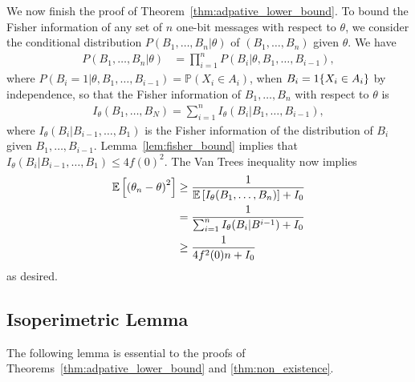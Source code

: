 We now finish the proof of Theorem~\ref{thm:adpative_lower_bound}.
To bound the Fisher information of any set of $n$ one-bit
messages with respect to $\theta$,
we consider the conditional distribution $P({B_1,\ldots,B_n|\theta})$ of
$(B_1,\ldots,B_n)$ given $\theta$. We have
\begin{align*}
  P\left( B_1,\ldots,B_n | \theta \right) & =  \prod_{i=1}^n P\left(B_i | \theta, B_1,\ldots,B_{i-1} \right),
\end{align*}
where $P\left(B_i =1 | \theta, B_1,\ldots,B_{i-1} \right) = \mathbb P\left(
X_i \in A_i\right)$, when $B_i = 1\!\left\{X_i \in A_i\right\}$ by independence,
so that the Fisher information of $B_1,\ldots,B_n$ with
respect to $\theta$ is
\begin{align}
I_\theta(B_1,\ldots,B_N) = \sum_{i=1}^n I_\theta (B_i|B_1,\ldots,B_{i-1}),
\label{eq:fisher_information}
\end{align}
where $I_\theta (B_i|B_{i-1},\ldots,B_1)$ is the Fisher information of the
distribution of $B_i$ given $B_1,\ldots,B_{i-1}$.
Lemma~\ref{lem:fisher_bound} implies that $I_\theta
(B_i|B_{i-1},\ldots,B_1) \leq 4f(0)^2$. The Van Trees inequality
\cite{van2004detection, gill1995applications} now implies
\begin{align*}
\mathbb{E}\left[  \left( \theta_n - \theta \right)^2\right] &  \geq \frac{1}{ \mathbb{E}\left[  I_\theta(B_1,\ldots,B_n)\right] + I_0} \\
& = \frac{1}{ \sum_{i=1}^n I_\theta (B_i | B^{i-1} ) + I_0} \\
& \geq \frac{1}{ 4f^2(0) n + I_0}
\end{align*}
as desired.

\subsection{Isoperimetric Lemma}
\label{sec:bound_intervals_delta}

The following lemma is essential to the proofs
of Theorems~\ref{thm:adpative_lower_bound} and
\ref{thm:non_existence}.


